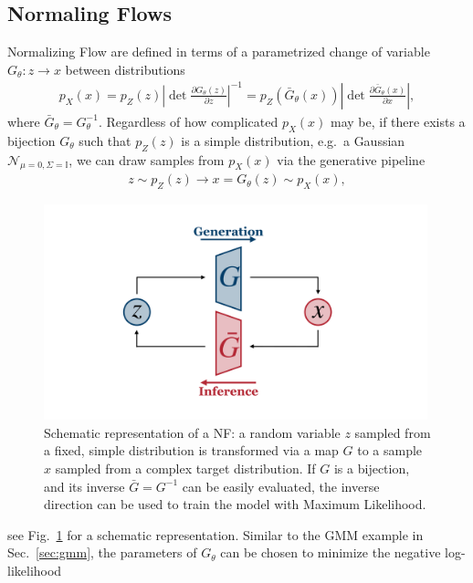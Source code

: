 \subsection{Normaling Flows}\label{intro:normflow}
Normalizing Flow  are defined in terms of a parametrized change of variable $G_{\theta}: z \rightarrow x$ between distributions
%
\begin{align}\label{eq:nf}
p_X(x) = p_Z(z) \left|\det \frac{\partial G_{\theta}(z)}{\partial z}\right|^{-1} = p_Z(\bar{G}_{\theta}(x)) \left|\det \frac{\partial \bar{G}_{\theta}(x)}{\partial x}\right|,
\end{align}
%
where $\bar{G}_{\theta} = G^{-1}_{\theta}$.
Regardless of how complicated $p_{X}(x)$ may be, if there exists a bijection $G_{\theta}$ such that $p_Z(z)$ is a simple distribution, e.g.\ a Gaussian $\mathcal{N}_{\mu=0, \Sigma=\mathbb{I}}$, we can draw samples from $p_{X}(x)$ via the generative pipeline
%
\begin{align}
z \sim p_Z(z) \longrightarrow x = G_{\theta}(z)  \sim p_{X}(x),
\end{align}
%
%
\begin{figure}[t]
\centering
\includegraphics[page = 1, width=0.99\textwidth]{./figures/inn}
\caption{Schematic representation of a NF: a random variable $z$ sampled from a fixed, simple distribution is transformed via a map $G$ to a sample $x$ sampled from a complex target distribution. If $G$ is a bijection, and its inverse $\bar{G} = G^{-1}$ can be easily evaluated, the inverse direction can be used to train the model with Maximum Likelihood.}
\label{fig:NF}
\end{figure}
%
see Fig.~\ref{fig:NF} for a schematic representation. Similar to the GMM example in Sec.~\ref{sec:gmm}, the parameters of $G_{\theta}$ can be chosen to minimize the negative log-likelihood
